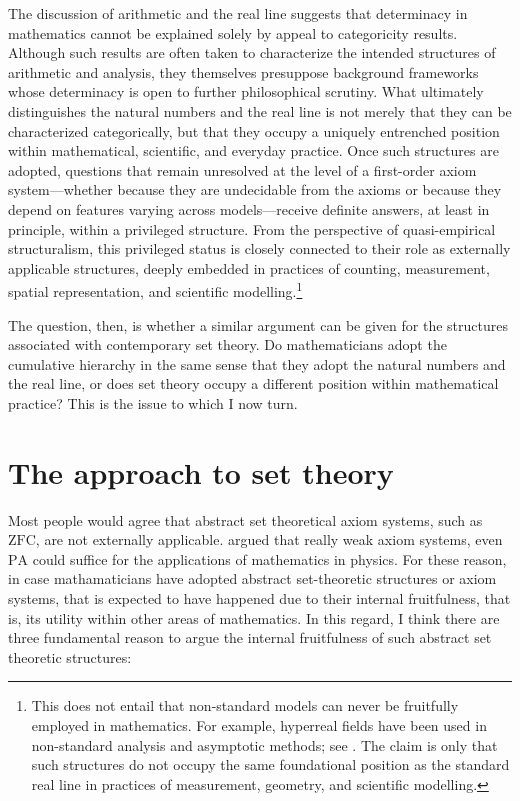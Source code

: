 \documentclass[11pt,a4paper]{article}
\begin{document}
The discussion of arithmetic and the real line suggests that determinacy in mathematics cannot be explained solely by appeal to categoricity results. Although such results are often taken to characterize the intended structures of arithmetic and analysis, they themselves presuppose background frameworks whose determinacy is open to further philosophical scrutiny. What ultimately distinguishes the natural numbers and the real line is not merely that they can be characterized categorically, but that they occupy a uniquely entrenched position within mathematical, scientific, and everyday practice. Once such structures are adopted, questions that remain unresolved at the level of a first-order axiom system—whether because they are undecidable from the axioms or because they depend on features varying across models—receive definite answers, at least in principle, within a privileged structure. From the perspective of quasi-empirical structuralism, this privileged status is closely connected to their role as externally applicable structures, deeply embedded in practices of counting, measurement, spatial representation, and scientific modelling.\footnote{This does not entail that non-standard models can never be fruitfully employed in mathematics. For example, hyperreal fields have been used in non-standard analysis and asymptotic methods; see \textcite{lightstone1975nonarchimedean}. The claim is only that such structures do not occupy the same foundational position as the standard real line in practices of measurement, geometry, and scientific modelling.}

The question, then, is whether a similar argument can be given for the structures associated with contemporary set theory. Do mathematicians adopt the cumulative hierarchy in the same sense that they adopt the natural numbers and the real line, or does set theory occupy a different position within mathematical practice? This is the issue to which I now turn.

\section{The approach to set theory}
\label{set-theory}

Most people would agree that abstract set theoretical axiom systems, such as $\mathrm{ZFC}$, are not externally applicable. \textcite{Feferman1993} argued that really weak axiom systems, even $\mathrm{PA}$ could suffice for the applications of mathematics in physics. For these reason, in case mathamaticians have adopted abstract set-theoretic structures or axiom systems, that is expected to have happened due to their internal fruitfulness, that is, its utility within other areas of mathematics. In this regard, I think there are three fundamental reason to argue the internal fruitfulness of such abstract set theoretic structures:
 
\end{document}

